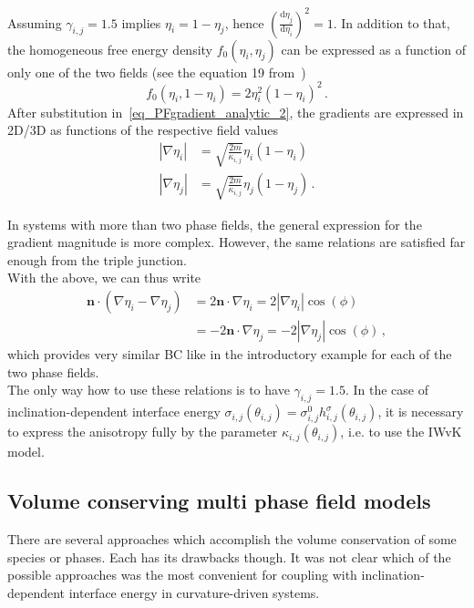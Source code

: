 	Assuming $\gamma_{i,j}=1.5$ implies $\eta_i = 1-\eta_j$, hence $\left( \frac{\mathrm{d} \eta_j}{\mathrm{d} \eta_i} \right)^2=1$. In addition to that, the homogeneous free energy density $f_0(\eta_{i},\eta_{j})$ can be expressed as a function of only one of the two fields (see the equation 19 from~\cite{Moelans2008})
	\begin{equation}
		f_0(\eta_{i},1-\eta_{i}) = 2\eta_{i}^2(1-\eta_{i})^2 \,.
	\end{equation}
	After substitution in~\ref{eq_PFgradient_analytic_2}, the gradients are expressed in 2D/3D as functions of the respective field values
	\begin{equation} \label{eq_PFgradient_analytic}
		\begin{split}
				|\nabla\eta_i| &= \sqrt{\frac{2m}{\kappa_{i,j}}}\eta_i(1-\eta_i)  \\
				|\nabla\eta_j| &= \sqrt{\frac{2m}{\kappa_{i,j}}}\eta_j(1-\eta_j)  \,.
			\end{split}
	\end{equation}
	
	In systems with more than two phase fields, the general expression for the gradient magnitude is more complex. However, the same relations are satisfied far enough from the triple junction. \\
	With the above, we can thus write
	\begin{equation}
		\begin{split}
			\bm{n}\cdot(\nabla\eta_i-\nabla\eta_j) &= 2\bm{n}\cdot\nabla\eta_i = 2|\nabla\eta_i|\cos(\phi) \\ &= -2\bm{n}\cdot\nabla\eta_j = -2|\nabla\eta_j|\cos(\phi) \,,
		\end{split}
	\end{equation}
	which provides very similar BC like in the introductory example for each of the two phase fields.\\
	The only way how to use these relations is to have $\gamma_{i,j}=1.5$. In the case of inclination-dependent interface energy $\sigma_{i,j}(\theta_{i,j})=\sigma_{i,j}^0h_{i,j}^\sigma(\theta_{i,j})$, it is necessary to express the anisotropy fully by the parameter $\kappa_{i,j}(\theta_{i,j})$, i.e. to use the IWvK model.
	
	\subsection{Volume conserving multi phase field models}\label{sec_volume_cons_PF_ch_NPA_PF}
	There are several approaches which accomplish the volume conservation of some species or phases. Each has its drawbacks though. It was not clear which of the possible approaches was the most convenient for coupling with inclination-dependent interface energy in curvature-driven systems.
	

